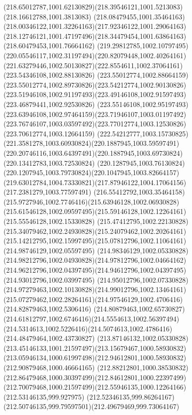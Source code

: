 {{	\curveto(218.65012787,1001.62130829)(218.39546121,1001.5213083)(218.16612788,1001.3813083)
	\curveto(218.08479455,1001.35464163)(218.00346122,1001.32264163)(217.92346122,1001.29064163)
	\curveto(218.12746121,1001.47197496)(218.34479454,1001.63864163)(218.60479453,1001.76664162)
	\curveto(219.29812785,1002.10797495)(220.05546117,1002.31197494)(220.82079448,1002.40264161)
	\curveto(221.63279446,1002.50130827)(222.8554611,1002.37064161)(223.54346108,1002.88130826)
	\curveto(223.55012774,1002.88664159)(223.55012774,1002.89730826)(223.54212774,1002.90130826)
	\curveto(223.51946108,1002.91197493)(223.49146108,1002.91597493)(223.46879441,1002.92530826)
	\curveto(223.55146108,1002.95197493)(223.63946108,1002.97464159)(223.71946107,1003.01197492)
	\curveto(223.76746107,1003.03597492)(223.77012774,1003.12530826)(223.70612774,1003.12664159)
	\curveto(222.54212777,1003.15730825)(221.3581278,1003.60930824)(220.1887945,1003.59597491)
	\curveto(220.20746116,1003.64397491)(220.1887945,1003.69730824)(220.13412783,1003.72530824)
	\curveto(220.1287945,1003.76130824)(220.1207945,1003.79730824)(220.1047945,1003.82664157)
	\curveto(219.63012784,1004.73330821)(217.87946122,1004.17064156)(217.2381279,1003.77597491)
	\curveto(216.55412792,1003.35464158)(215.9727946,1002.7746416)(215.63946128,1002.06930828)
	\curveto(215.61546128,1002.09597495)(215.59146128,1002.12264161)(215.55546128,1002.15330828)
	\curveto(215.47412795,1002.22130828)(215.34079462,1002.24930828)(215.24079462,1002.20264161)
	\curveto(215.14212795,1002.15997495)(215.07812796,1002.11064161)(214.98746129,1002.05597495)
	\curveto(214.98346129,1002.05330828)(214.98212796,1002.04930828)(214.97812796,1002.04664162)
	\curveto(214.96212796,1002.04397495)(214.94612796,1002.04397495)(214.93012796,1002.03997495)
	\curveto(214.95012796,1002.07330828)(214.97279463,1002.10130828)(214.99012796,1002.13464161)
	\curveto(215.07279462,1002.28264161)(214.97546129,1002.4706416)(214.82879463,1002.5306416)
	\curveto(214.80879463,1002.65730827)(214.61812797,1002.6746416)(214.5554613,1002.56397494)
	\curveto(214.5314613,1002.5226416)(214.5074613,1002.4786416)(214.48479464,1002.43730827)
	\curveto(213.87146132,1002.05330828)(213.45146133,1001.21597497)(213.15679467,1000.58930832)
	\curveto(213.05946134,1000.61997498)(212.94612801,1000.58930832)(212.90879468,1000.46664165)
	\curveto(212.88212801,1000.38530832)(212.86479468,1000.30397499)(212.84612801,1000.22397499)
	\curveto(212.70079468,1000.21597499)(212.55946135,1000.12264166)(212.53146135,999.927975)
	\curveto(212.52346135,999.86264167)(212.50746135,999.79597501)(212.49679469,999.73064167)
}}
